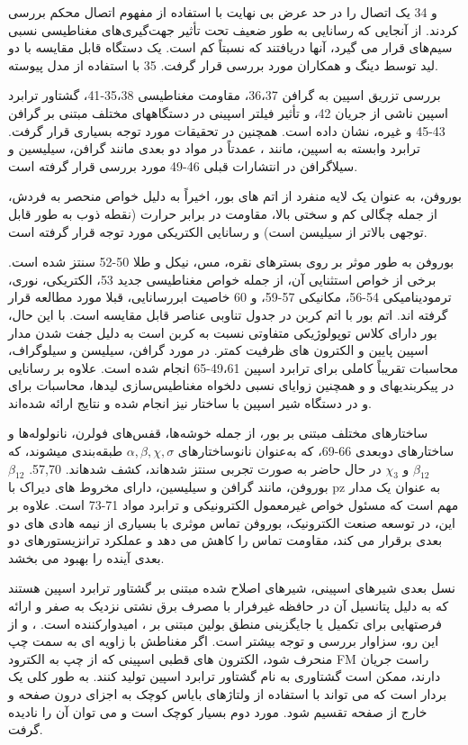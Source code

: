  و  34  یک اتصال  را در حد عرض بی نهایت با استفاده از مفهوم اتصال محکم بررسی کردند. از آنجایی که رسانایی به طور ضعیف تحت تأثیر جهت‌گیری‌های مغناطیسی نسبی سیم‌های  قرار می گیرد، آنها دریافتند که  نسبتاً کم است. یک دستگاه قابل مقایسه با دو لید  توسط دینگ و همکاران مورد بررسی قرار گرفت. 35 با استفاده از مدل پیوسته. 

بررسی تزریق اسپین به گرافن 36،37، مقاومت مغناطیسی  35،38-41، گشتاور ترابرد اسپین ناشی از جریان  42، و تأثیر فیلتر اسپینی در دستگاههای مختلف مبتنی بر گرافن 43-45 و غیره، نشان داده است. همچنین در تحقیقات مورد توجه بسیاری قرار گرفت. ترابرد وابسته به اسپین، مانند ، عمدتاً در مواد دو بعدی مانند گرافن، سیلیسین و سیلاگرافن در انتشارات قبلی 46-49 مورد بررسی قرار گرفته است. 

بوروفن، به عنوان یک لایه منفرد از اتم های بور، اخیراً به دلیل خواص منحصر به فردش، از جمله چگالی کم و سختی بالا، مقاومت در برابر حرارت (نقطه ذوب به طور قابل توجهی بالاتر از سیلیسن است) و رسانایی الکتریکی مورد توجه قرار گرفته است. 

بوروفن به طور موثر بر روی بسترهای نقره، مس، نیکل و طلا 50-52 سنتز شده است. برخی از خواص استثنایی آن، از جمله خواص مغناطیسی جدید 53، الکتریکی، نوری، ترمودینامیکی 54-56، مکانیکی 57-59، و 60 خاصیت ابررسانایی، قبلا مورد مطالعه قرار گرفته اند. اتم بور با اتم کربن در جدول تناوبی عناصر قابل مقایسه است. با این حال، بور دارای کلاس توپولوژیکی متفاوتی نسبت به کربن است به دلیل جفت شدن مدار اسپین پایین  و الکترون های ظرفیت کمتر. در مورد گرافن، سیلیسن و سیلوگراف، محاسبات تقریباً کاملی برای ترابرد اسپین 49،61-65 انجام شده است. علاوه بر رسانایی در پیکربندیهای  و  و همچنین زوایای نسبی دلخواه مغناطیس‌سازی لیدها، محاسبات برای  و  در دستگاه شیر اسپین با ساختار  نیز انجام شده و نتایج ارائه شده‌اند. 

ساختارهای مختلف مبتنی بر بور، از جمله خوشه‌ها، قفس‌های فولرن، نانولوله‌ها و ساختارهای دوبعدی 66-69، که به‌عنوان نانوساختارهای $\alpha,\beta,\chi,\sigma$ طبقه‌بندی میشوند، که $\beta_{12}$ و $\chi_{3}$ در حال حاضر به صورت تجربی سنتز شدهاند، کشف شدهاند. 57,70. $\beta_{12}$ بوروفن، مانند گرافن و سیلیسین، دارای مخروط های دیراک با pz به عنوان یک مدار مهم است که مسئول خواص غیرمعمول الکترونیکی و ترابرد مواد 71-73 است. علاوه بر این، در توسعه صنعت الکترونیک، بوروفن تماس موثری با بسیاری از نیمه هادی های دو بعدی برقرار می کند، مقاومت تماس را کاهش می دهد و عملکرد ترانزیستورهای دو بعدی آینده را بهبود می بخشد.

نسل بعدی شیرهای اسپینی، شیرهای اصلاح شده مبتنی بر گشتاور ترابرد اسپین  هستند که به دلیل پتانسیل آن در حافظه غیرفرار با مصرف برق نشتی نزدیک به صفر و ارائه فرصتهایی برای تکمیل یا جایگزینی منطق بولین مبتنی بر ، امیدوارکننده است. ، و از این رو، سزاوار بررسی و توجه بیشتر است. اگر مغناطش با زاویه ای به سمت چپ منحرف شود، الکترون های قطبی اسپینی که از چپ به الکترود FM راست جریان دارند، ممکن است گشتاوری به نام گشتاور ترابرد اسپین  تولید کنند. به طور کلی  یک بردار است که می تواند با استفاده از ولتاژهای بایاس کوچک به اجزای درون صفحه و خارج از صفحه تقسیم شود. مورد دوم بسیار کوچک است و می توان آن را نادیده گرفت. 

